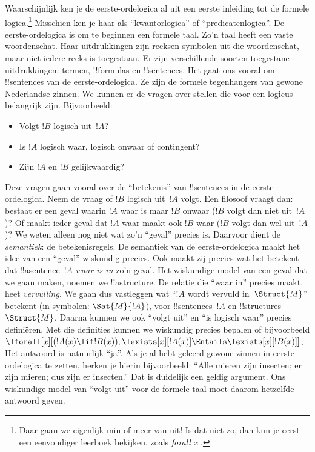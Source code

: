 \documentclass[../../../include/open-logic-section]{subfiles}
\begin{document}


Waarschijnlijk ken je de eerste-ordelogica al uit een eerste inleiding
tot de formele logica.\footnote{Daar gaan we eigenlijk min of meer van
uit!{} Is dat niet zo, dan kun je eerst een eenvoudiger leerboek
bekijken, zoals \emph{forall x} \citep{Magnus2021}.} Misschien ken je
haar als ``kwantorlogica'' of ``predicatenlogica''. De eerste-ordelogica
is om te beginnen een formele taal. Zo'n taal heeft een vaste
woordenschat. Haar uitdrukkingen zijn reeksen symbolen uit die
woordenschat, maar niet iedere reeks is toegestaan. Er zijn verschillende
soorten toegestane uitdrukkingen: termen, !!{formula}s en !!{sentence}s.
Het gaat ons vooral om !!{sentence}s van de eerste-ordelogica. Ze zijn de
formele tegenhangers van gewone Nederlandse zinnen. We kunnen er de
vragen over stellen die voor een logicus belangrijk zijn. Bijvoorbeeld:
\begin{itemize}
    \item Volgt $!B$ logisch uit~$!A$?
    \item Is $!A$ logisch waar, logisch onwaar of
contingent?
    \item Zijn $!A$ en $!B$ gelijkwaardig?
\end{itemize}

Deze vragen gaan vooral over de ``betekenis'' van !!{sentence}s in de
eerste-ordelogica. Neem de vraag of $!B$ logisch uit~$!A$ volgt. Een
filosoof vraagt dan: bestaat er een geval waarin $!A$ waar is maar $!B$
onwaar ($!B$ volgt dan niet uit~$!A$)? Of maakt ieder geval dat $!A$ waar
maakt ook $!B$ waar ($!B$ volgt dan wel uit~$!A$)? We weten alleen nog
niet wat zo'n ``geval'' precies is. Daarvoor dient de \emph{semantiek}:
de betekenisregels. De semantiek van de eerste-ordelogica maakt het idee
van een ``geval'' wiskundig precies. Ook maakt zij precies wat het
betekent dat !!a{sentence}~$!A$ \emph{waar is in} zo'n geval. Het
wiskundige model van een geval dat we gaan maken, noemen we
!!a{structure}. De relatie die ``waar in'' precies maakt, heet
\emph{vervulling}. We gaan dus vastleggen wat ``$!A$ wordt vervuld
in~$\Struct{M}$'' betekent (in symbolen: $\Sat{M}{!A}$), voor
!!{sentence}s~$!A$ en !!{structure}s~$\Struct{M}$. Daarna kunnen we ook
``volgt uit'' en ``is logisch waar'' precies definiëren. Met die
definities kunnen we
wiskundig precies bepalen of bijvoorbeeld
$\lforall[x][(!A(x) \lif !B(x)),
\lexists[x][!A(x)] \Entails \lexists[x][!B(x)]]$. Het antwoord is
natuurlijk ``ja''. Als je al hebt geleerd gewone zinnen in
eerste-ordelogica te zetten, herken je hierin bijvoorbeeld: ``Alle
mieren zijn insecten; er zijn mieren; dus zijn er insecten.'' Dat is
duidelijk een geldig argument. Ons wiskundige model van ``volgt uit''
voor de formele taal moet daarom hetzelfde antwoord geven.
\end{document}
